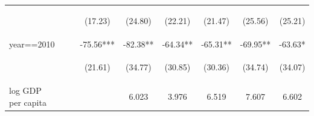 \documentclass[10pt,letterpaper,subeqn, xcolor=table]{beamer}
\begin{document}
\begin{frame}[label=otherPANEL]
\begin{table}[htpb!]
\begin{center}
{\begin{tabular}{lcccccccc}
        & \begin{footnotesize}\end{footnotesize} & \begin{footnotesize}\end{footnotesize} & \begin{footnotesize}(17.23)\end{footnotesize} & \begin{footnotesize}(24.80)\end{footnotesize} & \begin{footnotesize}(22.21)\end{footnotesize} & \begin{footnotesize}(21.47)\end{footnotesize} & \begin{footnotesize}(25.56)\end{footnotesize} & \begin{footnotesize}(25.21)\end{footnotesize} \\

        year==2010&&&-75.56***&-82.38**&-64.34**&-65.31**&-69.95**&-63.63*\\

        & \begin{footnotesize}\end{footnotesize} & \begin{footnotesize}\end{footnotesize} & \begin{footnotesize}(21.61)\end{footnotesize} & \begin{footnotesize}(34.77)\end{footnotesize} & \begin{footnotesize}(30.85)\end{footnotesize} & \begin{footnotesize}(30.36)\end{footnotesize} & \begin{footnotesize}(34.74)\end{footnotesize} & \begin{footnotesize}(34.07)\end{footnotesize} \\

        log GDP per capita&&&&6.023&3.976&6.519&7.607&6.602\\


\end{tabular}}
\end{center}
\end{table}
\end{frame}
\end{document}

